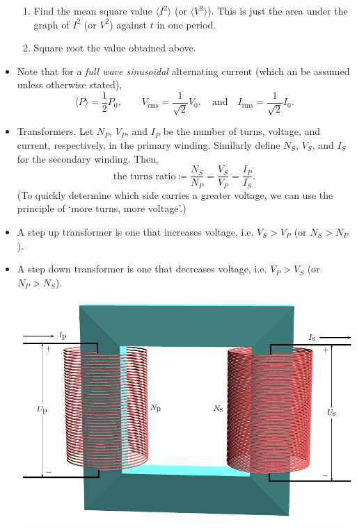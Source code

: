 \documentclass[oneside]{book}
\begin{document}
\begin{itemize}
\begin{enumerate}
        \item Find the mean square value \(\langle I^2 \rangle\) (or \(\langle V^2 \rangle\)). This is just the area under the graph of \(I^2\) (or \(V^2\)) against \(t\) in one period.
        \item Square root the value obtained above.
    \end{enumerate}
    \item Note that for a \emph{full wave sinusoidal} alternating current (which an be assumed unless otherwise stated), 
    \[\langle P \rangle=\frac{1}{2}P_0,\qquad V_{\text{rms}}=\frac{1}{\sqrt{2}}V_0,\quad\text{and}\quad I_{\text{rms}}=\frac{1}{\sqrt{2}}I_0.\]
    \item Transformers. Let \(N_P\), \(V_P\), and \(I_P\) be the number of turns, voltage, and current, respectively, in the primary winding. Similarly define \(N_S\), \(V_S\), and \(I_S\) for the secondary winding. Then,
    \[\text{the turns ratio}\coloneq\frac{N_S}{N_P}=\frac{V_S}{V_P}=\frac{I_P}{I_S}.\]
    (To quickly determine which side carries a greater voltage, we can use the principle of `more turns, more voltage'.)
    \item A step up transformer is one that increases voltage, i.e. \(V_S>V_P\) (or \(N_S>N_P\)).
    \item A step down transformer is one that decreases voltage, i.e. \(V_P>V_S\) (or \(N_P>N_S\)).
    \begin{center}
        \includegraphics[width=\textwidth-30pt]{../images/Transformer/TransformerCropped.pdf}
        \captionsetup{type=figure}
    \end{center}

\end{itemize}
\end{document}
